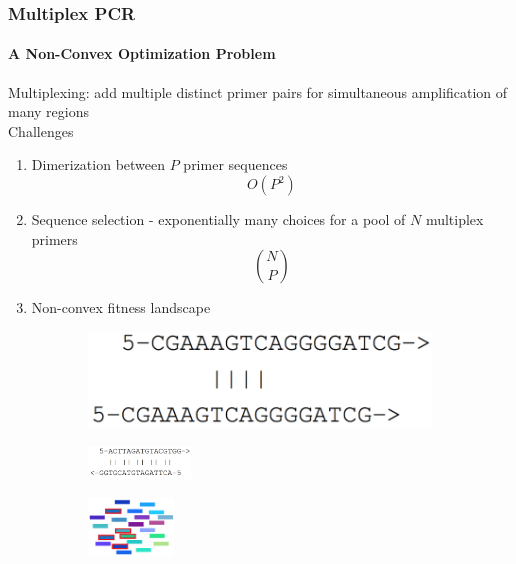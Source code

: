 \documentclass[xcolor=dvipsnames,envcountsect]{beamer}
\begin{document}
\begin{frame}
	\frametitle{Multiplex PCR}
	\framesubtitle{A Non-Convex Optimization Problem}
	
	Multiplexing: add multiple distinct primer pairs for simultaneous amplification of many regions\\
	Challenges
    \begin{multicols}{2}
	\begin{enumerate}
	    \item Dimerization between $P$ primer sequences $$O(P^2)$$ %
	    \item Sequence selection - exponentially many choices for a pool of $N$ multiplex primers $$\binom{N}{P}$$
	    \item Non-convex fitness landscape %
	 \end{enumerate}
	 \columnbreak
	 \begin{figure}
     \begin{subfigure}
         \centering 
         \includegraphics[width=.3\textwidth]{annealing_conn_fwd}
     \end{subfigure}
     \hfill
     \begin{subfigure} %
         \centering
         \includegraphics[width=0.3\textwidth]{annealing_disconn_rev}
     \end{subfigure}
     \begin{subfigure} %
         \centering
         \includegraphics[width=0.25\textwidth]{picto_primerpool}
     \end{subfigure}
     \end{figure}
\end{multicols}
\end{frame}
\end{document}
